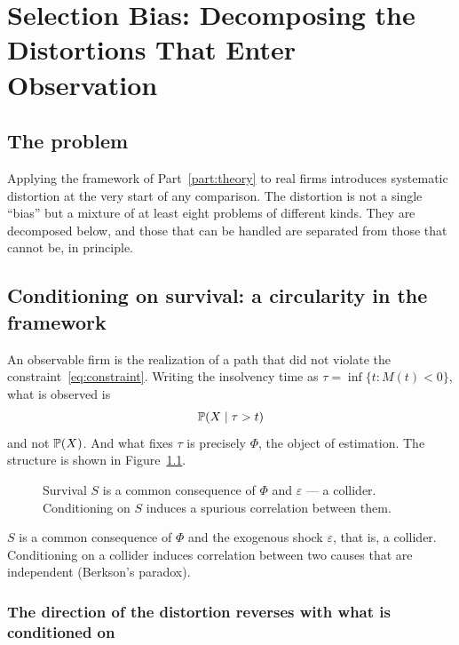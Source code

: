 \chapter{Selection Bias: Decomposing the Distortions That Enter Observation}
\label{ch:method}

\section{The problem}

Applying the framework of Part~\ref{part:theory} to real firms introduces systematic
distortion at the very start of any comparison. The distortion is not a single ``bias'' but
a mixture of at least eight problems of different kinds. They are decomposed below, and
those that can be handled are separated from those that cannot be, in principle.

\section{Conditioning on survival: a circularity in the framework}
\label{sec:survivorship}

An observable firm is the realization of a path that did not violate the
constraint~\eqref{eq:constraint}. Writing the insolvency time as
$\tau=\inf\{t:M(t)<0\}$, what is observed is
\begin{equation}
\mathbb{P}(X \mid \tau > t)
\end{equation}
and not $\mathbb{P}(X)$. And what fixes $\tau$ is precisely $\Phi$, the object of estimation.
The structure is shown in Figure~\ref{fig:dag}.

\begin{figure}[htbp]
\centering
{}
\caption{Survival $S$ is a common consequence of $\Phi$ and $\varepsilon$ --- a collider. Conditioning on $S$ induces a spurious correlation between them.}
\label{fig:dag}
\end{figure}

$S$ is a common consequence of $\Phi$ and the exogenous shock $\varepsilon$, that is, a
collider. Conditioning on a collider induces correlation between two causes that are
independent (Berkson's paradox).

\subsection{The direction of the distortion reverses with what is conditioned on}

